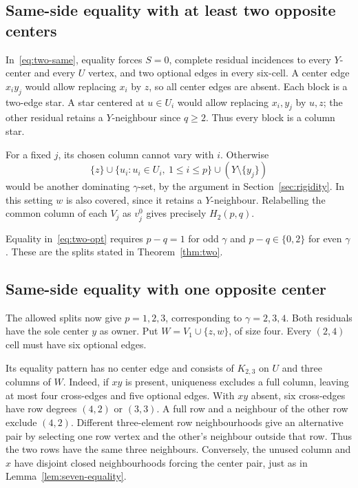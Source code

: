\documentclass[11pt]{article}
\theoremstyle{definition}
\theoremstyle{remark}
\begin{document}
\subsection{Same-side equality with at least two opposite centers}

In~\eqref{eq:two-same}, equality forces $S=0$, complete residual
incidences to every $Y$-center and every $U$ vertex, and two optional
edges in every six-cell. A center edge $x_i y_j$ would allow replacing
$x_i$ by $z$, so all center edges are absent. Each block is a two-edge
star. A star centered at $u\in U_i$ would allow replacing $x_i,y_j$ by
$u,z$; the other residual retains a $Y$-neighbour since $q\ge2$.
Thus every block is a column star.

For a fixed $j$, its chosen column cannot vary with $i$. Otherwise
\[
 \{z\}\cup\{u_i: u_i\in U_i,\ 1\le i\le p\}
        \cup(Y\setminus\{y_j\})
\]
would be another dominating $\gamma$-set, by the argument in
Section~\ref{sec:rigidity}. In this setting $w$ is also covered, since it
retains a $Y$-neighbour. Relabelling the common column of each $V_j$ as
$v_j^0$ gives precisely $H_2(p,q)$.

Equality in~\eqref{eq:two-opt} requires $p-q=1$ for odd $\gamma$ and
$p-q\in\{0,2\}$ for even $\gamma$. These are the splits stated in
Theorem~\ref{thm:two}.

\subsection{Same-side equality with one opposite center}

The allowed splits now give $p=1,2,3$, corresponding to $\gamma=2,3,4$.
Both residuals have the sole center $y$ as owner. Put
$W=V_1\cup\{z,w\}$, of size four. Every $(2,4)$ cell must have six
optional edges.

Its equality pattern has no center edge and consists of $K_{2,3}$ on
$U$ and three columns of $W$. Indeed, if $xy$ is present, uniqueness
excludes a full column, leaving at most four cross-edges and five
optional edges. With $xy$ absent, six cross-edges have row degrees
$(4,2)$ or $(3,3)$. A full row and a neighbour of the other row exclude
$(4,2)$. Different three-element row neighbourhoods give an alternative
pair by selecting one row vertex and the other's neighbour outside that
row. Thus the two rows have the same three neighbours. Conversely,
the unused column and $x$ have disjoint closed neighbourhoods forcing
the center pair, just as in Lemma~\ref{lem:seven-equality}.
\end{document}

